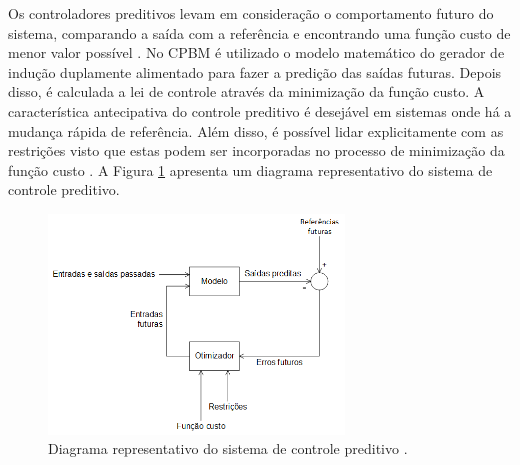 	Os controladores preditivos levam em consideração o comportamento futuro do sistema, comparando a saída com a referência e encontrando uma função custo de menor valor possível \cite{camachoteoriapreditivomodelo,rositierteoriapreditivomodelo,wangpreditivo}. No CPBM é utilizado o modelo matemático do gerador de indução duplamente alimentado para fazer a predição das saídas futuras. Depois disso, é calculada a lei de controle através da minimização da função custo. A característica antecipativa do controle preditivo é desejável em sistemas onde há a mudança rápida de referência. Além disso, é possível lidar explicitamente com as restrições visto que estas podem ser incorporadas no processo de minimização da função custo \cite{alfeu}. A Figura \ref{figura:preditivo_esquema} apresenta um diagrama representativo do sistema de controle preditivo.
	\begin{figure}[h]
		\centering
		\includegraphics[width=0.7\textwidth]{Figuras/preditivo_esquematico.png}
		\caption{Diagrama representativo do sistema de controle preditivo \cite{alfeu}.}
		\label{figura:preditivo_esquema}
	\end{figure}

